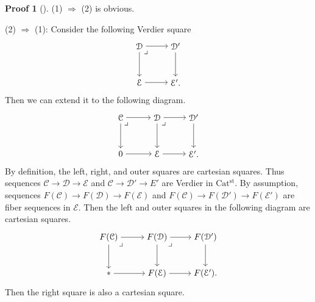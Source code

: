 \documentclass[a4paper,dvipdfmx,11pt,reqno]{amsart}
\newcommand{\C}{\mathcal{C}}
\newcommand{\D}{\mathcal{D}}
\newcommand{\E}{\mathcal{E}}
\newcommand{\Catst}{\mathrm{Cat^{st}}}
\theoremstyle{definition}
\newtheorem{newproof}[theorem]{Proof}
\begin{document}
\begin{newproof}[] \label{proof_of_CDH23.prop.1.5.5}
  (1) $\Rightarrow$ (2) is obvious.

  (2) $\Rightarrow$ (1): 
  Consider the following Verdier square
  \[\begin{tikzpicture}[auto,->] 
    \node (tl) at (0,1.5) {$\D$}; 
    \node (tr) at (1.5,1.5) {$\D'$};
    \node (bl) at (0,0) {$\E$}; 
    \node (br) at (1.5,0) {$\E'.$}; 
    \draw (tl) -- node {} (tr); 
    \draw (bl) -- node[swap] {} (br); 
    \draw (tl) -- node[swap] {} (bl);
    \draw (tr) -- node {} (br); 
    \node at (tl.south east) {$\lrcorner$};
  \end{tikzpicture}\]
  Then we can extend it to the following diagram.
  \[\begin{tikzpicture}[auto,->] 
    \node (tl) at (0,1.5) {$\C$};
    \node (tm) at (1.5,1.5) {$\D$}; 
    \node (tr) at (3,1.5) {$\D'$};
    \node (bl) at (0,0) {$0$}; 
    \node (bm) at (1.5,0) {$\E$};
    \node (br) at (3,0) {$\E'.$}; 
    \draw (tl) -- node {} (tm); 
    \draw (tm) -- node {} (tr); 
    \draw (bl) -- node[swap] {} (bm); 
    \draw (bm) -- node[swap] {} (br); 
    \draw (tl) -- node[swap] {} (bl);
    \draw (tm) -- node {} (bm);
    \draw (tr) -- node {} (br);
    \node at (tl.south east) {$\lrcorner$};
    \node at (tm.south east) {$\lrcorner$};
  \end{tikzpicture}\]
  By definition, the left, right, and outer squares are cartesian squares.
  Thus sequences $\C \to \D \to \E$ and $\C \to \D' \to E'$ are Verdier in $\Catst$.
  By assumption, sequences $F(\C) \to F(\D) \to F(\E)$ and $F(\C) \to F(\D') \to F(\E')$ are fiber sequences in $\E$.
  Then the left and outer squares in the following diagram are cartesian squares. 
  \[\begin{tikzpicture}[auto,->] 
    \node (tl) at (0,1.5) {$F(\C)$};
    \node (tm) at (2,1.5) {$F(\D)$}; 
    \node (tr) at (4,1.5) {$F(\D')$};
    \node (bl) at (0,0) {$\ast$}; 
    \node (bm) at (2,0) {$F(\E)$};
    \node (br) at (4,0) {$F(\E').$}; 
    \draw (tl) -- node {} (tm); 
    \draw (tm) -- node {} (tr); 
    \draw (bl) -- node[swap] {} (bm); 
    \draw (bm) -- node[swap] {} (br); 
    \draw (tl) -- node[swap] {} (bl);
    \draw (tm) -- node {} (bm);
    \draw (tr) -- node {} (br);
    \node at (tl.south east) {$\lrcorner$};
    \node at (tm.south east) {$\lrcorner$};
  \end{tikzpicture}\]
  Then the right square is also a cartesian square.
\end{newproof}
\end{document}
